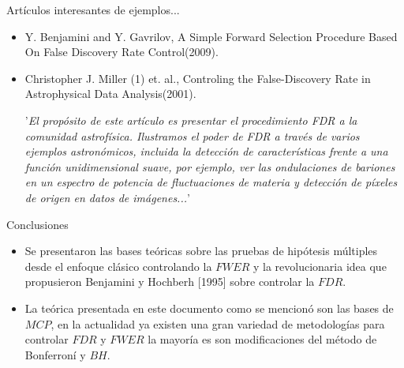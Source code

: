 \begin{frame}{Artículos interesantes de ejemplos...}
    \begin{itemize}[<+- | alert@+>]
	\item Y. Benjamini and Y. Gavrilov, A Simple Forward Selection Procedure Based On False Discovery Rate Control(2009). 
	
	\item Christopher J. Miller (1) et. al., Controling the False-Discovery Rate in Astrophysical Data Analysis(2001). 
	
	'\textit{El propósito de este artículo es presentar el procedimiento FDR a la comunidad astrofísica. Ilustramos el poder de FDR a través de varios ejemplos astronómicos, incluida la detección de características frente a una función unidimensional suave, por ejemplo, ver las \textit{ondulaciones de bariones} en un espectro de potencia de fluctuaciones de materia y detección de píxeles de origen en datos de imágenes...}'
	\end{itemize}
\end{frame}


\begin{frame}{Conclusiones}
    
    \begin{itemize}[<+- | alert@+>]
	\item Se presentaron las bases teóricas sobre las pruebas de hipótesis múltiples desde el enfoque clásico controlando la $FWER$ y la revolucionaria idea que propusieron Benjamini y Hochberh [1995] sobre controlar la $FDR$.
	
	\item La teórica presentada en este documento como se mencionó son las bases de $MCP$, en la actualidad ya existen una gran variedad de metodologías para controlar $FDR$ y $FWER$ la mayoría es son modificaciones del método de Bonferroní y $BH$.
	\end{itemize}
	
\end{frame}